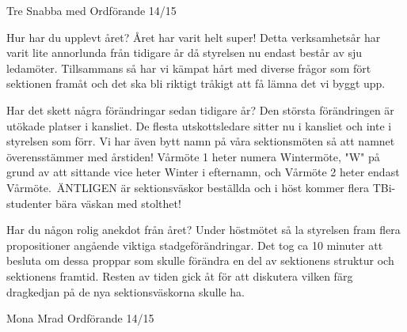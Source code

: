 Tre Snabba med Ordförande 14/15

Hur har du upplevt året?  Året har varit helt super! Detta
verksamhetsår har varit lite annorlunda från tidigare år då styrelsen
nu endast består av sju ledamöter. Tillsammans så har vi kämpat hårt
med diverse frågor som fört sektionen framåt och det ska bli riktigt
tråkigt att få lämna det vi byggt upp.

Har det skett några förändringar sedan tidigare år?  Den största
förändringen är utökade platser i kansliet. De flesta utskottsledare
sitter nu i kansliet och inte i styrelsen som förr. Vi har även bytt
namn på våra sektionsmöten så att namnet överensstämmer med årstiden!
Vårmöte 1 heter numera Wintermöte, "W" på grund av att sittande vice
heter Winter i efternamn, och Vårmöte 2 heter endast Vårmöte. ÄNTLIGEN
är sektionsväskor beställda och i höst kommer flera TBi-studenter bära
väskan med stolthet!

Har du någon rolig anekdot från året?  Under höstmötet så la styrelsen
fram flera propositioner angående viktiga stadgeförändringar. Det tog
ca 10 minuter att besluta om dessa proppar som skulle förändra en del
av sektionens struktur och sektionens framtid.  Resten av tiden gick
åt för att diskutera vilken färg dragkedjan på de nya sektionsväskorna
skulle ha.

Mona Mrad
Ordförande 14/15

